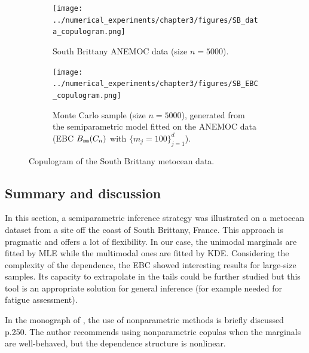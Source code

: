 \begin{landscape}
    \begin{figure}
        \begin{subfigure}[b]{0.49\linewidth}
            \centering
            \texttt{[image: ../numerical\_experiments/chapter3/figures/SB\_data\_copulogram.png]}
            \vspace*{2pt}
            \caption{South Brittany ANEMOC data (size $n=5000$).}
        \end{subfigure}
        \begin{subfigure}[b]{0.49\linewidth}
            \centering
            \texttt{[image: ../numerical\_experiments/chapter3/figures/SB\_EBC\_copulogram.png]}
            \caption{Monte Carlo sample (size $n=5000$), generated from the semiparametric model fitted on the ANEMOC data (EBC $B_{{\bf m}}(C_n)$ with $ \{m_j=100\}_{j=1}^d$).}
        \end{subfigure}
        \vspace*{5pt} 
        \caption{Copulogram of the South Brittany metocean data.}
        \label{fig:sb_copulograms}
    \end{figure}
\end{landscape}




\subsection{Summary and discussion}

In this section, a semiparametric inference strategy was illustrated on a metocean dataset from a site off the coast of South Brittany, France. 
This approach is pragmatic and offers a lot of flexibility. 
In our case, the unimodal marginals are fitted by MLE while the multimodal ones are fitted by KDE. 
Considering the complexity of the dependence, the EBC showed interesting results for large-size samples. 
Its capacity to extrapolate in the tails could be further studied \citep{heredia_2022_nonparam_copula} but this tool is an appropriate solution for general inference (for example needed for fatigue assessment). 

In the monograph of \citet{joe2011dependence}, the use of nonparametric methods is briefly discussed p.250. 
The author recommends using nonparametric copulas when the marginals are well-behaved, but the dependence structure is nonlinear. 


